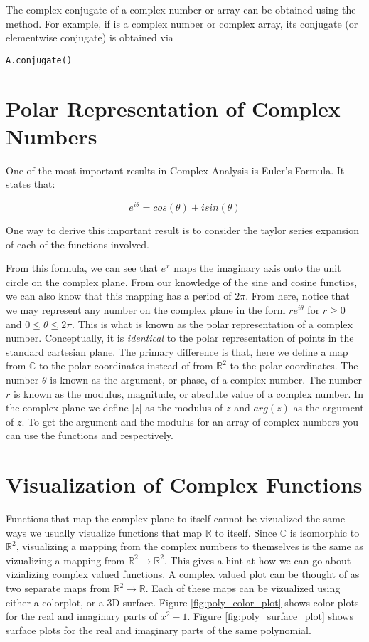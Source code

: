 The complex conjugate of a complex number or array can be obtained using the  method.
For example, if  is a complex number or complex array, its conjugate (or elementwise conjugate) is obtained via
\begin{lstlisting}
A.conjugate()
\end{lstlisting}

\section*{Polar Representation of Complex Numbers}

One of the most important results in Complex Analysis is Euler's Formula.
It states that:

\[e^{i\theta}=cos(\theta)+i sin(\theta)\]

One way to derive this important result is to consider the taylor series expansion of each of the functions involved.

From this formula, we can see that $e^x$ maps the imaginary axis onto the unit circle on the complex plane.
From our knowledge of the sine and cosine functios, we can also know that this mapping has a period of $2\pi$.
From here, notice that we may represent any number on the complex plane in the form $r e^{i\theta}$ for $r\geq 0$ and $0 \leq \theta \leq 2\pi$.
This is what is known as the polar representation of a complex number.
Conceptually, it is \emph{identical} to the polar representation of points in the standard cartesian plane.
The primary difference is that, here we define a map from $\mathbb{C}$ to the polar coordinates instead of from $\mathbb{R}^{2}$ to the polar coordinates.
The number $\theta$ is known as the argument, or phase, of a complex number.
The number $r$ is known as the modulus, magnitude, or absolute value of a complex number.
In the complex plane we define $|z|$ as the modulus of $z$ and $arg(z)$ as the argument of $z$.
To get the argument and the modulus for an array of complex numbers you can use the functions  and  respectively.

\section*{Visualization of Complex Functions}
Functions that map the complex plane to itself cannot be vizualized the same ways we usually visualize functions that map $\mathbb{R}$ to itself.
Since $\mathbb{C}$ is isomorphic to $\mathbb{R}^2$, visualizing a mapping from the complex numbers to themselves is the same as vizualizing a mapping from $\mathbb{R}^2 \to \mathbb{R}^2$.
This gives a hint at how we can go about vizializing complex valued functions.
A complex valued plot can be thought of as two separate maps from $\mathbb{R}^2 \to \mathbb{R}$.
Each of these maps can be vizualized using either a colorplot, or a 3D surface.
Figure \ref{fig:poly_color_plot} shows color plots for the real and imaginary parts of $x^2 - 1$.
Figure \ref{fig:poly_surface_plot} shows surface plots for the real and imaginary parts of the same polynomial.

